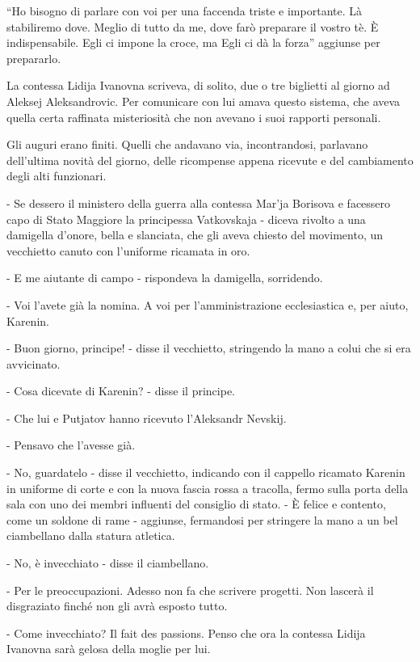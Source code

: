 ``Ho bisogno di parlare con voi per una faccenda triste e importante. Là stabiliremo dove. Meglio di tutto da me, dove farò preparare il vostro tè. È indispensabile. Egli ci impone la croce, ma Egli ci dà la forza'' aggiunse per prepararlo. 

La contessa Lidija Ivanovna scriveva, di solito, due o tre biglietti al giorno ad Aleksej Aleksandrovic. Per comunicare con lui amava questo sistema, che aveva quella certa raffinata misteriosità che non avevano i suoi rapporti personali. 

\label{xxiv-3} 

Gli auguri erano finiti. Quelli che andavano via, incontrandosi, parlavano dell'ultima novità del giorno, delle ricompense appena ricevute e del cambiamento degli alti funzionari. 

- Se dessero il ministero della guerra alla contessa Mar'ja Borisova e facessero capo di Stato Maggiore la principessa Vatkovskaja - diceva rivolto a una damigella d'onore, bella e slanciata, che gli aveva chiesto del movimento, un vecchietto canuto con l'uniforme ricamata in oro. 

- E me aiutante di campo - rispondeva la damigella, sorridendo. 

- Voi l'avete già la nomina. A voi per l'amministrazione ecclesiastica e, per aiuto, Karenin. 

- Buon giorno, principe! - disse il vecchietto, stringendo la mano a colui che si era avvicinato. 

- Cosa dicevate di Karenin? - disse il principe. 

- Che lui e Putjatov hanno ricevuto l'Aleksandr Nevskij. 

- Pensavo che l'avesse già. 

- No, guardatelo - disse il vecchietto, indicando con il cappello ricamato Karenin in uniforme di corte e con la nuova fascia rossa a tracolla, fermo sulla porta della sala con uno dei membri influenti del consiglio di stato. - È felice e contento, come un soldone di rame - aggiunse, fermandosi per stringere la mano a un bel ciambellano dalla statura atletica. 

- No, è invecchiato - disse il ciambellano. 

- Per le preoccupazioni. Adesso non fa che scrivere progetti. Non lascerà il disgraziato finché non gli avrà esposto tutto. 

- Come invecchiato? Il fait des passions. Penso che ora la contessa Lidija Ivanovna sarà gelosa della moglie per lui. 

